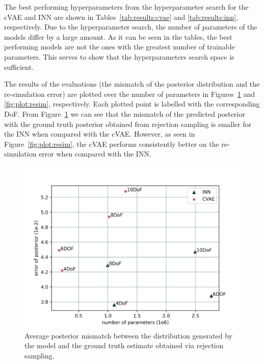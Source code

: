 \documentclass[conference]{IEEEtran}
\begin{document}
The best performing hyperparameters from the hyperparameter search for the cVAE and INN are shown in Tables~\ref{tab:results:cvae} and \ref{tab:results:inn}, respectively. Due to the hyperparameter search, the number of parameters of the models differ by a large amount. As it can be seen in the tables, the best performing models are not the ones with the greatest number of trainable parameters. This serves to show that the hyperparameters search space is sufficient. 

The results of the evaluations (the mismatch of the posterior distribution and the re-simulation error) are plotted over the number of parameters in Figures~\ref{fig:plot:posterior} and \ref{fig:plot:resim}, respectively. Each plotted point is labelled with the corresponding DoF. From Figure~\ref{fig:plot:posterior} we can see that the mismatch of the predicted posterior with the ground truth posterior obtained from rejection sampling is smaller for the INN when compared with the cVAE. However, as seen in Figure~\ref{fig:plot:resim}, the cVAE performs consistently better on the re-simulation error when compared with the INN.

\begin{figure}[t]
\centering
	\includegraphics[width=\linewidth]{figures/comparison_e_posterior_alternative.png}
    \caption{\label{fig:plot:posterior} Average posterior mismatch between the distribution generated by the model and the ground truth estimate obtained via rejection sampling.}
\end{figure}
\end{document}
